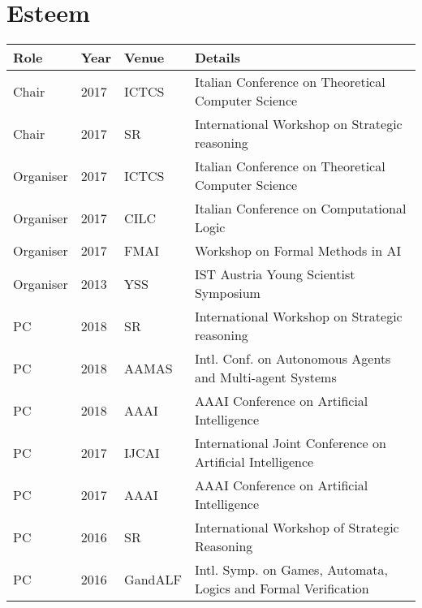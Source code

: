 \documentclass[10pt,a4paper,sans]{moderncv}
\begin{document}
 \section{Esteem}
 
 
\begin{tabular}{|l|l|l|l|}
\hline
 Role & Year & Venue & Details\\
 \hline \hline
 Chair & 2017 & ICTCS & Italian Conference on Theoretical Computer Science \\ 
  Chair & 2017  &SR  & International Workshop on Strategic reasoning	\\
 \hline
 Organiser & 2017 & ICTCS & Italian Conference on Theoretical Computer Science  \\
 Organiser & 2017 & CILC & Italian Conference on Computational Logic  \\
 Organiser & 2017  & FMAI & Workshop on Formal Methods in AI \\
 Organiser & 2013 & YSS & IST Austria Young Scientist Symposium \\
 \hline
 PC & 2018& SR  & International Workshop on Strategic reasoning  \\
 PC & 2018  &AAMAS & Intl. Conf. on Autonomous Agents and Multi-agent Systems\\
 PC & 2018 & AAAI & AAAI Conference on Artificial Intelligence \\ 
 PC & 2017 & IJCAI  & International Joint Conference on Artificial Intelligence \\
 PC & 2017  &AAAI & AAAI Conference on Artificial Intelligence\\
 PC & 2016  &SR & International Workshop of Strategic Reasoning \\
 PC & 2016 &GandALF & Intl. Symp. on Games, Automata, Logics and Formal Verification \\

\end{tabular}
\end{document}

